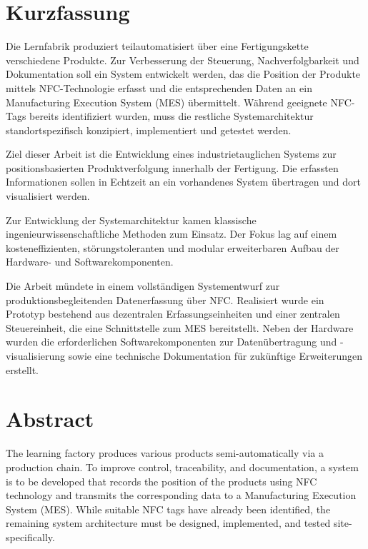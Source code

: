 \chapter*{Kurzfassung} %

Die Lernfabrik produziert teilautomatisiert über eine Fertigungskette verschiedene Produkte. Zur Verbesserung der Steuerung, Nachverfolgbarkeit und Dokumentation soll ein System entwickelt werden, das die Position der Produkte mittels NFC-Technologie erfasst und die entsprechenden Daten an ein Manufacturing Execution System (MES) übermittelt. Während geeignete NFC-Tags bereits identifiziert wurden, muss die restliche Systemarchitektur standortspezifisch konzipiert, implementiert und getestet werden.

Ziel dieser Arbeit ist die Entwicklung eines industrietauglichen Systems zur positionsbasierten Produktverfolgung innerhalb der Fertigung. Die erfassten Informationen sollen in Echtzeit an ein vorhandenes System übertragen und dort visualisiert werden.

Zur Entwicklung der Systemarchitektur kamen klassische ingenieurwissenschaftliche Methoden zum Einsatz. Der Fokus lag auf einem kosteneffizienten, störungstoleranten und modular erweiterbaren Aufbau der Hardware- und Softwarekomponenten.

Die Arbeit mündete in einem vollständigen Systementwurf zur produktionsbegleitenden Datenerfassung über NFC. Realisiert wurde ein Prototyp bestehend aus dezentralen Erfassungseinheiten und einer zentralen Steuereinheit, die eine Schnittstelle zum MES bereitstellt. Neben der Hardware wurden die erforderlichen Softwarekomponenten zur Datenübertragung und -visualisierung sowie eine technische Dokumentation für zukünftige Erweiterungen erstellt.

\clearpage

\chapter*{Abstract} %

The learning factory produces various products semi-automatically via a production chain. To improve control, traceability, and documentation, a system is to be developed that records the position of the products using NFC technology and transmits the corresponding data to a Manufacturing Execution System (MES). While suitable NFC tags have already been identified, the remaining system architecture must be designed, implemented, and tested site-specifically.

